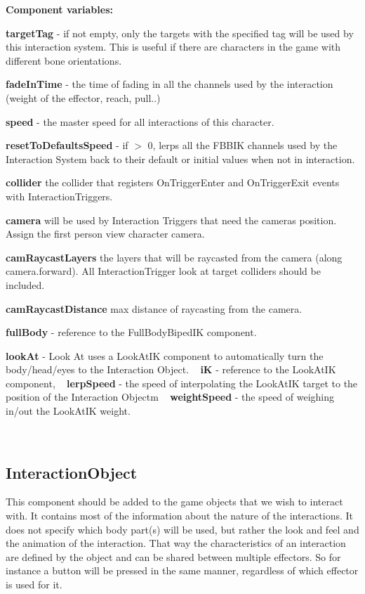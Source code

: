 {\bfseries Component variables\+:}
\begin{DoxyItemize}
\item {\bfseries target\+Tag} -\/ if not empty, only the targets with the specified tag will be used by this interaction system. This is useful if there are characters in the game with different bone orientations.
\item {\bfseries fade\+In\+Time} -\/ the time of fading in all the channels used by the interaction (weight of the effector, reach, pull..)
\item {\bfseries speed} -\/ the master speed for all interactions of this character.
\item {\bfseries reset\+To\+Defaults\+Speed} -\/ if $>$ 0, lerps all the F\+B\+B\+IK channels used by the Interaction System back to their default or initial values when not in interaction.
\item {\bfseries collider} the collider that registers On\+Trigger\+Enter and On\+Trigger\+Exit events with Interaction\+Triggers.
\item {\bfseries camera} will be used by Interaction Triggers that need the camera\textquotesingle{}s position. Assign the first person view character camera.
\item {\bfseries cam\+Raycast\+Layers} the layers that will be raycasted from the camera (along camera.\+forward). All Interaction\+Trigger look at target colliders should be included.
\item {\bfseries cam\+Raycast\+Distance} max distance of raycasting from the camera.
\item {\bfseries full\+Body} -\/ reference to the Full\+Body\+Biped\+IK component.
\item {\bfseries look\+At} -\/ Look At uses a Look\+At\+IK component to automatically turn the body/head/eyes to the Interaction Object. ~\newline
{\bfseries iK} -\/ reference to the Look\+At\+IK component, ~\newline
{\bfseries lerp\+Speed} -\/ the speed of interpolating the Look\+At\+IK target to the position of the Interaction Objectm ~\newline
{\bfseries weight\+Speed} -\/ the speed of weighing in/out the Look\+At\+IK weight.
\end{DoxyItemize}



~\newline
 \hypertarget{page10_interactionObject}{}\subsection{Interaction\+Object}\label{page10_interactionObject}
This component should be added to the game objects that we wish to interact with. It contains most of the information about the nature of the interactions. It does not specify which body part(s) will be used, but rather the look and feel and the animation of the interaction. That way the characteristics of an interaction are defined by the object and can be shared between multiple effectors. So for instance a button will be pressed in the same manner, regardless of which effector is used for it.

